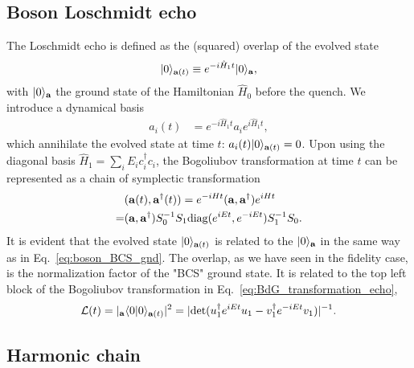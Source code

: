 \subsection{Boson Loschmidt echo}
\label{app_sub:boson_Loschmidt_echo}

The Loschmidt echo is defined as the (squared) overlap of the evolved state
\begin{equation}\begin{aligned}
|0\rangle_{{\bf a}(t)}\equiv e^{-i\hat{H}_1t}|0\rangle_{\bf a},
\end{aligned}\end{equation}
with $|0\rangle_{\bf a}$ the ground state of the Hamiltonian $\hat{H}_0$ before the quench. We introduce a dynamical basis
\begin{equation}\begin{aligned}
a_i(t)&=e^{-i\hat{H}_1t}a_ie^{i\hat{H}_1t},
\end{aligned}\end{equation}
which annihilate the evolved state at time $t$: $a_i(t)|0\rangle_{{\bf a}(t)}=0$. Upon using the diagonal basis $\hat{H}_1=\sum_iE_ic_i^\dagger c_i$, the Bogoliubov transformation at time $t$ can be represented as a chain of symplectic transformation
\begin{equation}\begin{aligned}
\label{eq:BdG_transformation_echo}
&({\bf a}(t),{\bf a}^\dagger(t))=e^{-iHt}
({\bf a} , {\bf a}^\dagger)e^{iHt} \\
=&({\bf a},{\bf a}^\dagger)S_0^{-1}S_1\text{diag}(e^{iEt},e^{-iEt})S_1^{-1}S_0.
\end{aligned}\end{equation}
It is evident that the evolved state $|0\rangle_{{\bf a}(t)}$ is related to the $|0\rangle_{{\bf a}}$ in the same way as in Eq.~\eqref{eq:boson_BCS_gnd}. The overlap, as we have seen in the fidelity case, is the normalization factor of the "BCS" ground state. It is related to the top left block of the Bogoliubov transformation in Eq.~\eqref{eq:BdG_transformation_echo},
\begin{equation}\begin{aligned}
\label{eq:echo_t}
\mathcal{L}(t)=|_{\bf a}\langle0|0\rangle_{{\bf a}(t)}|^2=|\text{det}(u_1^\dagger e^{iEt}u_1-v_1^\dagger e^{-iEt}v_1)|^{-1}.
\end{aligned}\end{equation}

\subsection{Harmonic chain} 
\label{app_sub:harmonic_chain}


